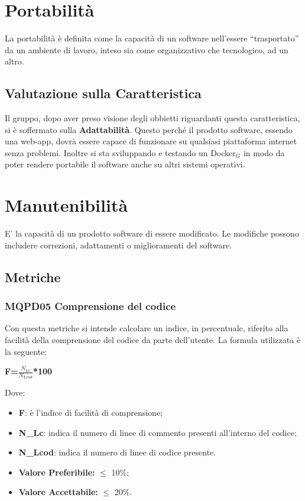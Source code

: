\section{Portabilità} \label{QualitàDelProdottoPortabilità}
La portabilità è definita come la capacità di un software nell’essere “trasportato” da un ambiente di lavoro, inteso sia come organizzativo che tecnologico,  ad un altro.

\subsection{Valutazione sulla Caratteristica} \label{QualitàDelProdottoPortabilitàValutazioneSullaCaratteristica}
Il gruppo, dopo aver preso visione degli obbietti riguardanti questa caratteristica, si è soffermato sulla \textbf{Adattabilità}.
Questo perché il prodotto software, essendo una web-app, dovrà essere capace di funzionare su qualsiasi piattaforma internet senza problemi.
Inoltre si sta sviluppando e testando un Docker$_G$ in modo da poter rendere portabile il software anche su altri sistemi operativi.

\section{Manutenibilità} \label{QualitàDelProdottoManutenibilità}
E' la capacità di un prodotto software di essere modificato. Le modifiche possono includere correzioni, adattamenti o miglioramenti del software.
\subsection{Metriche}  \label{QualitàDelProdottoManutenibilitàMetriche}
\subsubsection{MQPD05 Comprensione del codice}\label{QualitàDelProdottoManutenibilitàMetricheMQPD05}
Con questa metriche si intende calcolare un indice, in percentuale, riferito alla facilità della comprensione del codice da parte dell'utente.
La formula utilizzata è la seguente:
\begin{center}
	\textbf{F=$\frac{N_{Lc}}{N_{Lcod}}$*100}
\end{center}
Dove:
\begin{itemize}
	\item \textbf{F}: è l'indice di facilità di comprensione;
	\item \textbf{N\_{Lc}}: indica il numero di linee di commento presenti all'interno del codice;
	\item \textbf{N\_{Lcod}}: indica il numero di linee di codice presente.
\end{itemize}
\begin{itemize}
	\item \textbf{Valore Preferibile:} $\leq$ 10\%;
	\item \textbf{Valore  Accettabile:} $\leq$ 20\%.
\end{itemize}

